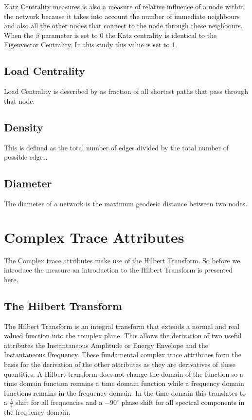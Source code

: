 Katz Centrality measures is also a measure of relative influence of a node within the network because it takes into account the number of immediate neighbours and also all the other nodes that connect to the node through these neighbours. When the $\beta$ parameter is set to 0 the Katz centrality is identical to the Eigenvector Centrality. In this study this value is set to 1.

\subsection{Load Centrality}

Load Centrality is described by \citeauthor{Goh2001,PhysRevE.64.016132}\cite{Goh2001,PhysRevE.64.016132}
as fraction of all shortest paths that pass through that node.


\subsection{Density}
This is defined as the total number of edges divided by the total number of possible edges. \cite{Hanneman2005}

\subsection{Diameter}
The diameter of a network is the maximum geodesic distance between two nodes.\cite{Hanneman2005}

\section{Complex Trace Attributes}

The Complex trace attributes make use of the Hilbert Transform. So before we introduce the measure an introduction to the Hilbert Transform is presented here.

\subsection{The Hilbert Transform}

The Hilbert Transform is an integral transform that extends a normal and real valued function into the complex plane. This allows the derivation of two useful attributes the Instantaneous Amplitude or Energy Envelope and the Instantaneous Frequency. These fundamental complex trace attributes form the basis for the derivation of the other attributes as they are derivatives of these quantities. A Hilbert transform does not change the domain of the function so a time domain function remains a time domain function while a frequency domain functions remains in the frequency domain. In the time domain this translates to a $\frac{\lambda}{4}$ shift for all frequencies and a $-90^{\circ}$ phase shift for all spectral components in the frequency domain. \cite{Johansson1999}

